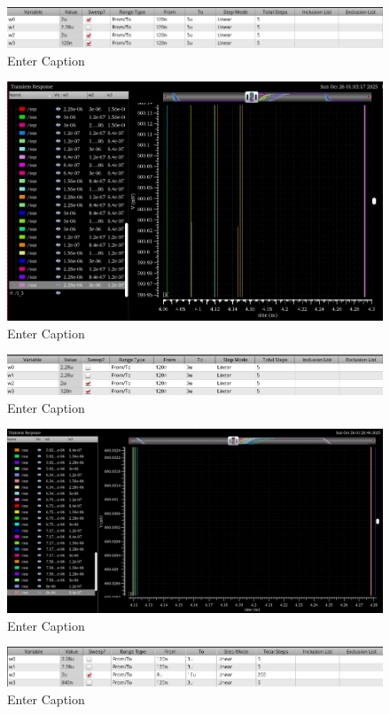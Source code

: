 \documentclass[12pt]{article}
\begin{document}
\begin{figure}
    \centering
    \includegraphics[width=1\linewidth]{writeup//figures/wmux_3_parametric_sweep_setup.png}
    \caption{Enter Caption}
\end{figure}

\begin{figure}[H]
    \centering
    \includegraphics[width=0.5\linewidth]{writeup//figures/wmux_3_parametrics_weep.png}
    \caption{Enter Caption}
\end{figure}

\begin{figure}[H]
    \centering
    \includegraphics[width=0.5\linewidth]{writeup//figures/wmux_2_parametric_sweep_setup.png}
    \caption{Enter Caption}
\end{figure}

\begin{figure}[H]
    \centering
    \includegraphics[width=0.5\linewidth]{writeup//figures/wmux_2_parametrics_weep.png}
    \caption{Enter Caption}
\end{figure}

\begin{figure}[H]
    \centering
    \includegraphics[width=0.5\linewidth]{writeup//figures/wmux_1_parametric_sweep_setup.png}
    \caption{Enter Caption}
\end{figure}
\end{document}
